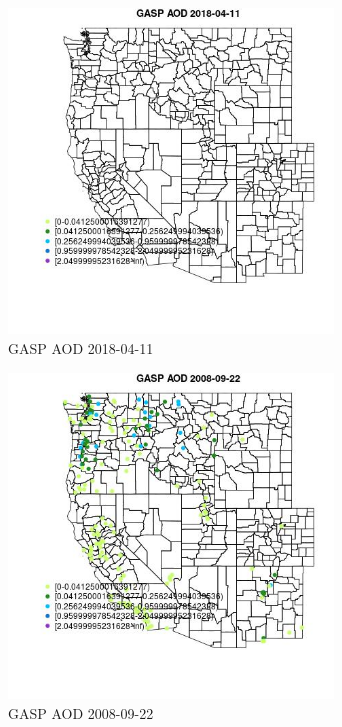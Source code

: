 \begin{figure} 
\centering  
\includegraphics[width=0.77\textwidth]{Code_Outputs/Report_ML_input_PM25_Step4_part_e_de_duplicated_aves_compiled_2019-05-18wNAs_MapObsGASP_AOD2018-04-11.jpg} 
\caption{\label{fig:Report_ML_input_PM25_Step4_part_e_de_duplicated_aves_compiled_2019-05-18wNAsMapObsGASP_AOD2018-04-11}GASP AOD 2018-04-11} 
\end{figure} 
 

\begin{figure} 
\centering  
\includegraphics[width=0.77\textwidth]{Code_Outputs/Report_ML_input_PM25_Step4_part_e_de_duplicated_aves_compiled_2019-05-18wNAs_MapObsGASP_AOD2008-09-22.jpg} 
\caption{\label{fig:Report_ML_input_PM25_Step4_part_e_de_duplicated_aves_compiled_2019-05-18wNAsMapObsGASP_AOD2008-09-22}GASP AOD 2008-09-22} 
\end{figure} 
 

